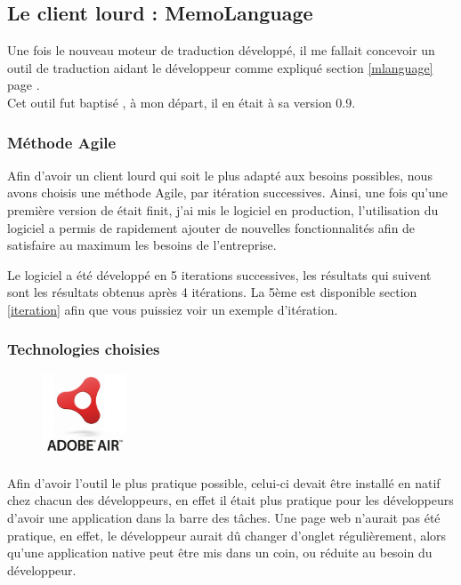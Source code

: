     \subsection{Le client lourd : MemoLanguage}
        Une fois le nouveau moteur de traduction développé, il me fallait concevoir un outil de traduction aidant le développeur comme expliqué section \ref{mlanguage} page \pageref{mlanguage}. \\
        Cet outil fut baptisé \mlanguage{}, à mon départ, il en était à sa version 0.9.
        \subsubsection{Méthode Agile}
            Afin d'avoir un client lourd qui soit le plus adapté aux besoins possibles, nous avons choisis une méthode Agile, par itération successives. Ainsi, une fois qu'une première version de \mlanguage{} était finit, j'ai mis le logiciel en production, l'utilisation du logiciel a permis de rapidement ajouter de nouvelles fonctionnalités afin de satisfaire au maximum les besoins de l'entreprise.

            Le logiciel a été développé en 5 iterations successives, les résultats qui suivent sont les résultats obtenus après 4 itérations. La 5ème est disponible section \ref{iteration} afin que vous puissiez voir un exemple d'itération.
        \subsubsection{Technologies choisies}

       \begin{figure}
            \includegraphics[width=2.5cm]{images/2-activite/air.jpg}
        \end{figure}
        Afin d'avoir l'outil le plus pratique possible, celui-ci devait être installé en natif chez chacun des développeurs, en effet il était plus pratique pour les développeurs d'avoir une application dans la barre des tâches. Une page web n'aurait pas été pratique, en effet, le développeur aurait dû changer d'onglet régulièrement, alors qu'une application native peut être mis dans un coin, ou réduite au besoin du développeur.

